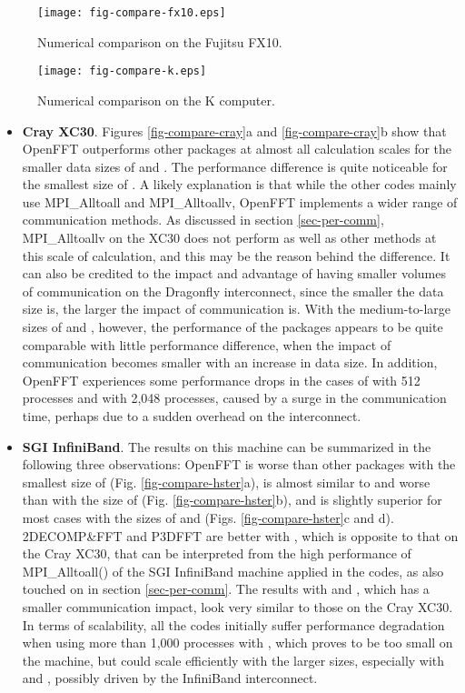 \begin{figure}[htb]
\begin{center}
\texttt{[image: fig-compare-fx10.eps]}
\end{center}
\caption{Numerical comparison on the Fujitsu FX10.}
\label{fig-compare-fx10}
\end{figure}

\begin{figure}[htb]
\begin{center}
\texttt{[image: fig-compare-k.eps]}
\end{center}
\caption{Numerical comparison on the K computer.}
\label{fig-compare-k}
\end{figure}

\begin{itemize}
\item
\textbf{Cray XC30}. Figures \ref{fig-compare-cray}a and \ref{fig-compare-cray}b show that OpenFFT outperforms other packages at almost all calculation scales for the smaller data sizes of  and . The performance difference is quite noticeable for the smallest size of . A likely explanation is that while the other codes mainly use MPI\_Alltoall and MPI\_Alltoallv, OpenFFT implements a wider range of communication methods. As discussed in section \ref{sec-per-comm}, MPI\_Alltoallv on the XC30 does not perform as well as other methods at this scale of calculation, and this may be the reason behind the difference. It can also be credited to the impact and advantage of having smaller volumes of communication on the Dragonfly interconnect, since the smaller the data size is, the larger the impact of communication is. With the medium-to-large sizes of  and , however, the performance of the packages appears to be quite comparable with little performance difference, when the impact of communication becomes smaller with an increase in data size. In addition, OpenFFT experiences some performance drops in the cases of  with 512 processes and  with 2,048 processes, caused by a surge in the communication time, perhaps due to a sudden overhead on the interconnect.     
\item
\textbf{SGI InfiniBand}. The results on this machine can be summarized in the following three observations: OpenFFT is worse than other packages with the smallest size of  (Fig. \ref{fig-compare-hster}a), is almost similar to and worse than with the size of  (Fig. \ref{fig-compare-hster}b), and is slightly superior for most cases with the sizes of  and  (Figs. \ref{fig-compare-hster}c and d). 2DECOMP\&FFT and P3DFFT are better with , which is opposite to that on the Cray XC30, that can be interpreted from the high performance of MPI\_Alltoall() of the SGI InfiniBand machine applied in the codes, as also touched on in section \ref{sec-per-comm}. The results with  and , which has a smaller communication impact, look very similar to those on the Cray XC30. In terms of scalability, all the codes initially suffer performance degradation when using more than 1,000 processes with , which proves to be too small on the machine, but could scale efficiently with the larger sizes, especially with  and , possibly driven by the InfiniBand interconnect.   

\end{itemize}
